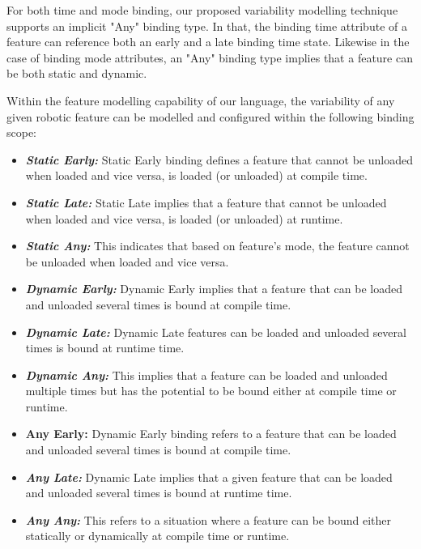 \documentclass[conference]{IEEEtran}
\begin{document}
For both time and mode binding, our proposed variability modelling technique supports an implicit "Any" binding type. In that, the binding time attribute of a feature can reference both an early and a late binding time state. Likewise in the case of binding mode attributes, an "Any" binding type implies that a feature can be both static and dynamic.

Within the feature modelling capability of our language, the variability of any given robotic feature can be modelled and configured within the following binding scope:

\begin{itemize}
    \item \textit{\textbf{Static Early:}} Static Early binding defines a feature that cannot be unloaded when loaded and vice versa, is loaded (or unloaded) at compile time. 
    
    \item \textit{\textbf{Static Late:}} Static Late implies that a feature that cannot be unloaded when loaded and vice versa, is loaded (or unloaded) at runtime.
    
    \item \textit{\textbf{Static Any:}} This indicates that based on feature's mode, the feature cannot be unloaded when loaded and vice versa.  
    
    \item \textit{\textbf{Dynamic Early:}} Dynamic Early implies that a feature that can be loaded and unloaded several times is bound at compile time.
    
    \item \textit{\textbf{Dynamic Late:}} Dynamic Late features can be loaded and unloaded several times is bound at runtime time.
    
    \item \textit{\textbf{Dynamic Any:}} This implies that a feature can be loaded and unloaded multiple times but has the potential to be bound either at compile time or runtime.
    
    \item \textbf{Any Early: }Dynamic Early binding refers to a feature that can be loaded and unloaded several times is bound at compile time.
    
    \item \textit{\textbf{Any Late:}} Dynamic Late implies that a given feature that can be loaded and unloaded several times is bound at runtime time.
    
    \item \textit{\textbf{Any Any:}} This refers to a situation where a feature can be bound either statically or dynamically at compile time or runtime. 
\end{itemize}
\end{document}
